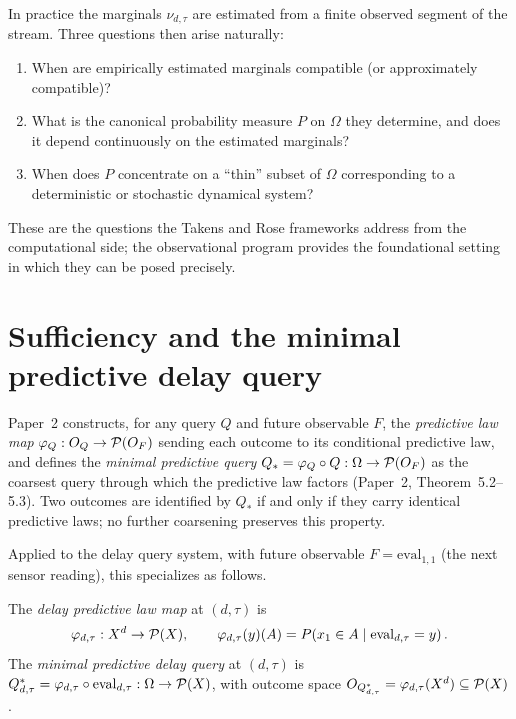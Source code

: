 \begin{remark}
In practice the marginals $\nu_{d,\tau}$ are estimated from a finite
observed segment of the stream.  Three questions then arise naturally:
\begin{enumerate}
  \item When are empirically estimated marginals compatible (or
    approximately compatible)?
  \item What is the canonical probability measure $P$ on $\Omega$ they
    determine, and does it depend continuously on the estimated marginals?
  \item When does $P$ concentrate on a ``thin'' subset of $\Omega$
    corresponding to a deterministic or stochastic dynamical system?
\end{enumerate}
These are the questions the Takens and Rose frameworks address from the
computational side; the observational program provides the foundational
setting in which they can be posed precisely.
\end{remark}

\section{Sufficiency and the minimal predictive delay query}
\label{sec:sufficiency}

Paper~2 constructs, for any query $Q$ and future observable $F$, the
\emph{predictive law map} $\varphi_Q : O_Q \to \mathcal{P}(O_F)$ sending each
outcome to its conditional predictive law, and defines the \emph{minimal
predictive query} $Q_* = \varphi_Q \circ Q : \Omega \to \mathcal{P}(O_F)$ as the
coarsest query through which the predictive law factors
(Paper~2, Theorem~5.2--5.3).  Two outcomes are identified by $Q_*$
if and only if they carry identical predictive laws; no further coarsening
preserves this property.

Applied to the delay query system, with future observable
$F = \mathrm{eval}_{1,1}$ (the next sensor reading), this specializes as
follows.

\begin{definition}\label{def:delay-pred-map}
The \emph{delay predictive law map} at $(d,\tau)$ is
\[
  \varphi_{d,\tau} : X^d \to \mathcal{P}(X),
  \qquad
  \varphi_{d,\tau}(y)(A) = P\!\left(x_{1} \in A \mid \mathrm{eval}_{d,\tau} = y\right).
\]
The \emph{minimal predictive delay query} at $(d,\tau)$ is
$Q^*_{d,\tau} = \varphi_{d,\tau} \circ \mathrm{eval}_{d,\tau} : \Omega \to \mathcal{P}(X)$,
with outcome space $O_{Q^*_{d,\tau}} = \varphi_{d,\tau}(X^d) \subseteq \mathcal{P}(X)$.
\end{definition}

